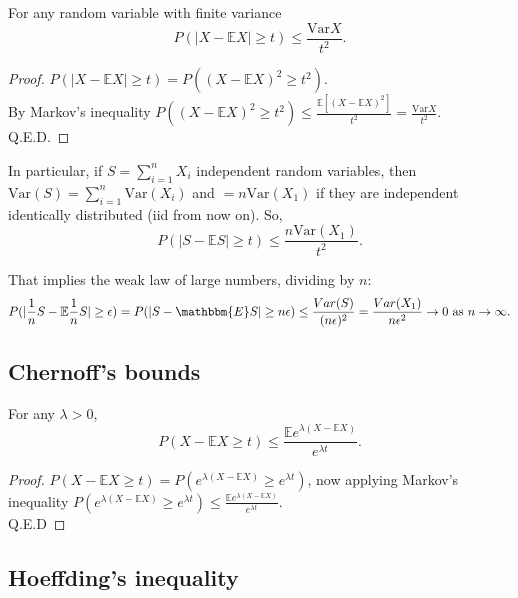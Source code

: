 \documentclass[11pt, english]{article}
\newcommand{\su}[2]{\sum\limits_{#1}^{#2}}
\begin{document}
For any random variable with finite variance
\begin{equation}
	P(|X-\mathbb{E}X|\geq t)\leq \frac{\text{Var} X}{t^2}.
\end{equation}

\begin{proof}
	$P(|X-\mathbb{E}X|\geq t)=P((X-\mathbb{E}X)^2\geq t^2)$. \\
	By Markov's inequality $P((X-\mathbb{E}X)^2\geq t^2)\leq \frac{\mathbb{E}[(X-\mathbb{E}X)^2]}{t^2}=\frac{\text{Var} X}{t^2}$.\\
	Q.E.D.
\end{proof}

In particular, if $S=\su{i=1}{n} X_i$ independent random variables, then $\text{Var}(S)=\sum\limits_{i=1}^n \text{Var}(X_i)$ and $=n\text{Var}(X_1)$ if they are independent identically distributed (iid from now on). So,
\begin{equation}
	P(|S-\mathbb{E} S|\geq t)\leq \frac{n\text{Var}(X_1)}{t^2}.
\end{equation}

That implies the weak law of large numbers, dividing by $n$:
\begin{equation}
	P(|\frac{1}{n}S-\mathbb{E}\frac{1}{n}S|\geq \epsilon) = P(|S -\mathbbm{E}S| \geq n\epsilon)\leq\frac{Var(S)}{(n\epsilon)^2} = \frac{Var(X_1)}{n\epsilon^2} \rightarrow 0\text{ as }n\rightarrow\infty.
\end{equation} 



\subsection*{Chernoff's bounds}

For any $\lambda>0$,
\begin{equation}
	P(X-\mathbb{E}X\geq t)\leq\frac{\mathbb{E}e^{\lambda(X-\mathbb{E}X)}}{e^{\lambda t}}.
\end{equation} 
\begin{proof}
	$P(X-\mathbb{E}X\geq t)=P(e^{\lambda(X-\mathbb{E}X)}\geq e^{\lambda t})$, now applying Markov's inequality $P(e^{\lambda(X-\mathbb{E}X)}\geq e^{\lambda t})\leq \frac{\mathbb{E}e^{\lambda(X-\mathbb{E}X)}}{e^{\lambda t}}$. \\ Q.E.D
\end{proof}

\subsection*{Hoeffding's inequality}
\end{document}
